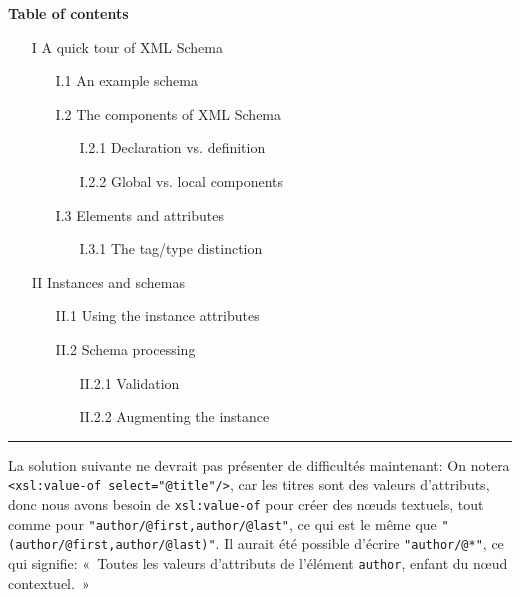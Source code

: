 \noindent\textbf{Table of contents}
\begin{itemize}
  \item [I] A quick tour of XML Schema
    \begin{itemize}
      \item [I.1] An example schema
      \item [I.2] The components of XML Schema
        \begin{itemize}
          \item [I.2.1] Declaration vs. definition
          \item [I.2.2] Global vs. local components
        \end{itemize}
      \item [I.3] Elements and attributes
        \begin{itemize}
          \item [I.3.1] The tag/type distinction
        \end{itemize}
    \end{itemize}
  \item [II] Instances and schemas
    \begin{itemize}
      \item [II.1] Using the instance attributes
      \item [II.2] Schema processing
        \begin{itemize}
          \item [II.2.1] Validation
          \item [II.2.2] Augmenting the instance
        \end{itemize}
    \end{itemize}
\end{itemize}
\noindent\rule{\linewidth}{0.5pt}

\bigskip

\noindent La solution suivante ne devrait pas présenter de difficultés maintenant:
\noindent On notera \texttt{<xsl:value-of select="@title"/>}, car les
titres sont des valeurs d'attributs, donc nous avons besoin de
\texttt{xsl:value-of} pour créer des nœuds textuels, tout comme
pour \texttt{"author/@first,author/@last"}, ce qui est le même que
\texttt{"(author/@first,author/@last)"}. Il aurait été possible
d'écrire \texttt{"author/@*"}, ce qui signifie: «~Toutes les valeurs
d'attributs de l'élément \texttt{author}, enfant du nœud
contextuel.~»


